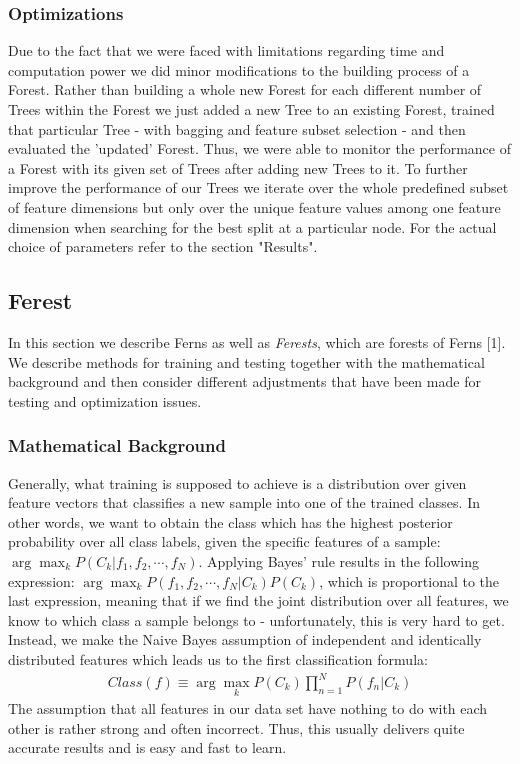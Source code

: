 \documentclass[twocolumn]{article}
\begin{document}
\subsubsection{Optimizations}
Due to the fact that we were faced with limitations regarding time and computation power we did minor modifications to the building process of a Forest. Rather than building a whole new Forest for each different number of Trees within the Forest we just added a new Tree to an existing Forest, trained that particular Tree - with bagging and feature subset selection - and then evaluated the 'updated' Forest. Thus, we were able to monitor the performance of a Forest with its given set of Trees after adding new Trees to it. To further improve the performance of our Trees we iterate over the whole predefined subset of feature dimensions but only over the unique feature values among one feature dimension when searching for the best split at a particular node. For the actual choice of parameters refer to the section "Results".


\subsection{Ferest}

In this section we describe Ferns as well as \textit{Ferests}, which are forests of Ferns [1]. We describe methods for training and testing together with the mathematical background and then consider different adjustments that have been made for testing and optimization issues.\\

\subsubsection{Mathematical Background}

Generally, what training is supposed to achieve is a distribution over given feature vectors that classifies a new sample into one of the trained classes. In other words, we want to obtain the class which has the highest posterior probability over all class labels, given the specific features of a sample: $\arg\max_k P(C_k \vert f_1,f_2, \cdots ,f_N)$. Applying Bayes' rule results in the following expression: $\arg\max_k P(f_1,f_2, \cdots ,f_N \vert C_k)P(C_k)$, which is proportional to the last expression, meaning that if we find the joint distribution over all features, we know to which class a sample belongs to - unfortunately, this is very hard to get. Instead, we make the Naive Bayes assumption of independent and identically distributed features which leads us to the first classification formula:
\begin{align*}
Class(f) \equiv \arg\max_k P(C_k) \prod_{n=1}^N P(f_n\vert C_k)
\end{align*}
The assumption that all features in our data set have nothing to do with each other is rather strong and often incorrect. Thus, this usually delivers quite accurate results and is easy and fast to learn.
\end{document}
